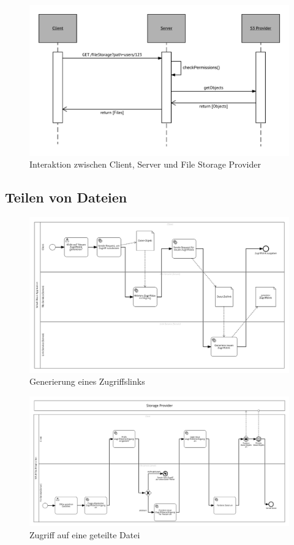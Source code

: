 
\begin{figure}[H]
	\centering
	\includegraphics[width=1\linewidth]{images/fileumlsequence}
	\caption[Caption for concept]{Interaktion zwischen Client, Server und File Storage Provider}
\end{figure}


\subsection{Teilen von Dateien}

\begin{figure}[H]
	\includegraphics[width=1\linewidth]{images/filesharinggeneration}
	\caption[Caption for concept]{Generierung eines Zugriffslinks}
	\centering
\end{figure}

\begin{figure}[H]
	\includegraphics[width=1\linewidth]{images/filesharingusing}
	\caption[Caption for concept]{Zugriff auf eine geteilte Datei}
	\centering
\end{figure}


\clearpage
